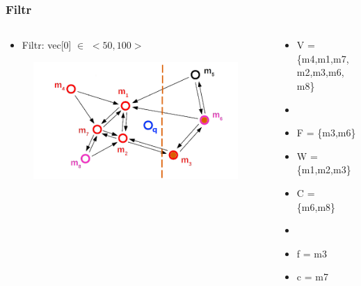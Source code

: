 \documentclass{beamer}
\begin{document}
	\begin{frame}
		\frametitle{Filtr}
		\begin{columns}[T] %
			\begin{column}{.6\textwidth}
				\begin{itemize}
					\item[] Filtr: vec[0] $\in$ $<50,100>$
				\end{itemize}
				
				\begin{figure}
					\includegraphics[scale=0.3]{figures/Filtry_b3.png}
				\end{figure}
			\end{column}%
			\hfill%
			\begin{column}{.4\textwidth}
				\begin{itemize}
					\item V = \{m4,m1,m7,m2,m3,m6, m8\}
					\item[]
					\item F = \{m3,m6\}
					\item W = \{m1,m2,m3\}
					\item C = \{m6,m8\}
					\item[]
					\item f = m3
					\item c = m7
				\end{itemize}
			\end{column}%
		\end{columns}
	\end{frame}
\end{document}

